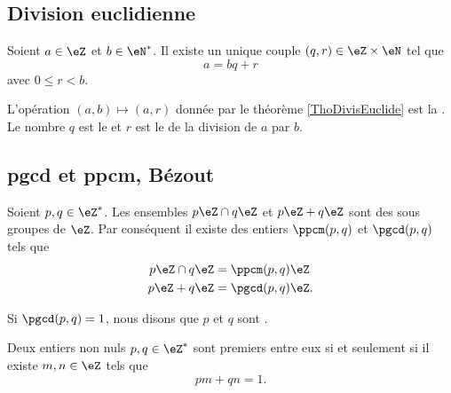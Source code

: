 \subsection{Division euclidienne}

\begin{theorem}     \label{ThoDivisEuclide}
    Soient \( a\in\eZ\) et \( b\in\eN^*\). Il existe un unique couple \( (q,r)\in\eZ\times\eN\) tel que
    \begin{equation}
        a=bq+r
    \end{equation}
    avec \( 0\leq r<b\).
\end{theorem}

L'opération \( (a,b)\mapsto(a,r)\) donnée par le théorème \ref{ThoDivisEuclide} est la . Le nombre \( q\) est le  et \( r\) est le  de la division de \( a\) par \( b\).

\subsection{pgcd et ppcm, Bézout}

Soient \( p,q\in\eZ^*\). Les ensembles \( p\eZ\cap q\eZ\) et \( p\eZ+q\eZ\) sont des sous groupes de \( \eZ\). Par conséquent il existe des entiers \( \ppcm(p,q)\) et \( \pgcd(p,q)\) tels que
\begin{subequations}
    \begin{align}
        p\eZ\cap q\eZ&=\ppcm(p,q)\eZ\\
        p\eZ + q\eZ&=\pgcd(p,q)\eZ.
    \end{align}
\end{subequations}

Si \( \pgcd(p,q)=1\), nous disons que \( p\) et \( q\) sont .

\begin{theorem} \label{ThoBuNjam}
    Deux entiers non nuls \( p,q\in\eZ^*\) sont premiers entre eux si et seulement si il existe \( m,n\in\eZ\) tels que 
    \begin{equation}
        pm+qn=1.
    \end{equation}
\end{theorem}

